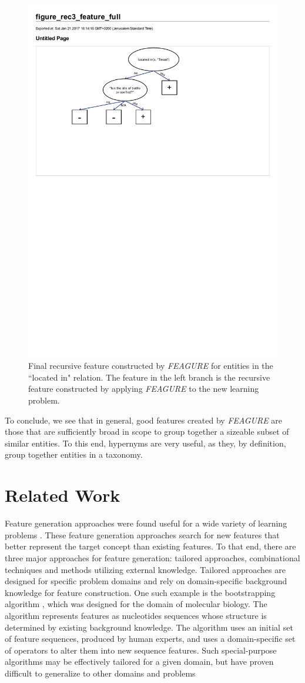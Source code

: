 \documentclass[twoside,11pt]{article}
\theoremstyle{definition}
\begin{document}
\begin{figure}[!h]
	\centering
	\includegraphics[width=0.6\linewidth]{figure_rec3_feature_full}
	\caption{Final recursive feature constructed by \emph{FEAGURE} for entities in the ``located in" relation. The feature in the left branch is the recursive feature constructed by applying \emph{FEAGURE} to the new learning problem.}
	\label{fig:figure_rec3_feature_full}
\end{figure}

To conclude, we see that in general, good features created by \emph{FEAGURE} are those that are sufficiently broad in scope to group together a sizeable subset of similar entities. To this end, hypernyms are very useful, as they, by definition, group together entities in a taxonomy. 

\section{Related Work}

Feature generation approaches were found useful for a wide variety of learning problems \cite{markovitch2002feature,ragavan1993complex,utgo1991linear}.
These feature generation approaches search for new features that better represent the target concept than existing features. To that end, there are three major approaches for feature generation: tailored approaches, combinational techniques and methods utilizing external knowledge.
Tailored approaches \cite{sutton1991learning,hirsh1994bootstrapping} are designed for specific problem domains and rely on domain-specific background knowledge for feature construction. One such example is the bootstrapping algorithm \cite{hirsh1994bootstrapping}, which was designed for the domain of molecular biology. The algorithm represents features as nucleotides sequences
whose structure is determined by existing background knowledge. The algorithm uses an initial set of feature sequences, produced by human experts, and uses a domain-specific set of operators to alter them into new sequence features. Such special-purpose algorithms may be effectively tailored for a given domain, but have proven difficult to generalize to other domains and problems
\end{document}
